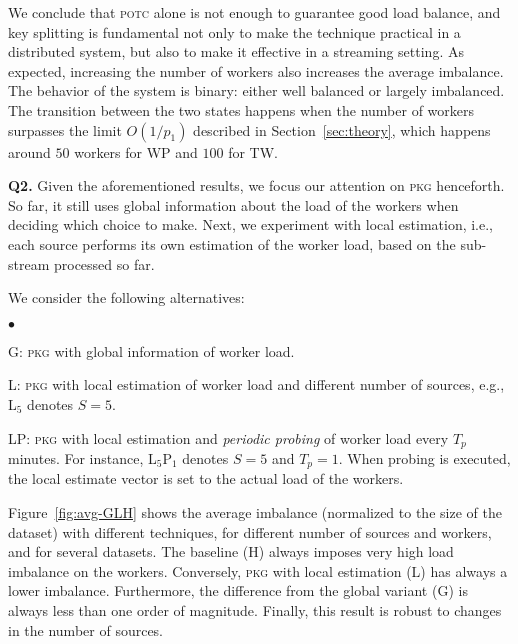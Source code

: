 \documentclass[10pt,conference,letterpaper]{IEEEtran}
\newcommand{\spara}[1]{\smallskip\noindent\textbf{#1}}
\newenvironment {squishlist}
{\begin{list}{$\bullet$}
  { \setlength{\itemsep}{1pt}
     \setlength{\parsep}{1pt}
     \setlength{\topsep}{1pt}
     \setlength{\partopsep}{1pt}
     \setlength{\leftmargin}{1.5em}
     \setlength{\labelwidth}{1em}
     \setlength{\labelsep}{0.5em} } }
{\end{list}}
\newcommand{\potc}{\textsc{p\textup{o}tc}\xspace}
\newcommand{\pkgs}{\textsc{pkg}\xspace}
\newcommand{\numsources}{S\xspace}
\begin{document}
We conclude that \potc alone is not enough to guarantee good load balance, and key splitting is fundamental not only to make the technique practical in a distributed system, but also to make it effective in a streaming setting.
As expected, increasing the number of workers also increases the average imbalance.
The behavior of the system is binary: either well balanced or largely imbalanced.
The transition between the two states happens when the number of workers surpasses the limit $O(1/p_1)$ described in Section~\ref{sec:theory}, which happens around $50$ workers for WP and $100$ for TW.










\spara{Q2.}
Given the aforementioned results, we focus our attention on \pkgs henceforth.
So far, it still uses global information about the load of the workers when deciding which choice to make.
Next, we experiment with local estimation, i.e., each source performs its own estimation of the worker load, based on the sub-stream processed so far.

We consider the following alternatives:
\begin{squishlist}
\item[G:] \pkgs with global information of worker load.
\item[L:] \pkgs with local estimation of worker load and different number of sources, e.g., L$_5$ denotes $\numsources=5$.
\item[LP:] \pkgs with local estimation and \emph{periodic probing} of worker load every $T_p$ minutes. For instance, L$_5$P$_1$ denotes $\numsources=5$ and $T_p=1$.
When probing is executed, the local estimate vector is set to the actual load of the workers.
\end{squishlist}

Figure~\ref{fig:avg-GLH} shows the average imbalance (normalized to the size of the dataset) with different techniques, for different number of sources and workers, and for several datasets.
The baseline (H) always imposes very high load imbalance on the workers.
Conversely, \pkgs with local estimation (L) has always a lower imbalance.
Furthermore, the difference from the global variant (G) is always less than one order of magnitude.
Finally, this result is robust to changes in the number of sources.
\end{document}
